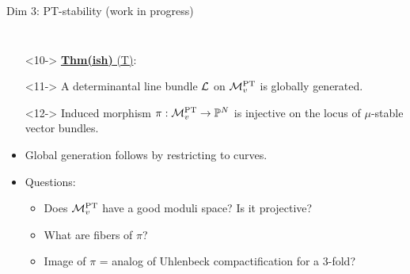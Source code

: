 \documentclass[8pt]{beamer} %
\begin{document}
\begin{frame}{Dim 3: PT-stability (work in progress)}
\begin{columns}[t]
        \begin{itemize}
            \item[]<10-> \underline{\textbf{Thm(ish)} (T)}: 
                \item[]<11-> A determinantal line bundle $\mathcal{L}$ on $\mathcal{M}^{\text{PT}}_v$ is globally generated.
                \item[]<12-> Induced morphism $\pi: \mathcal{M}^{\text{PT}}_v \to \mathbb{P}^N$ is injective on the locus of $\mu$-stable vector bundles.
            \item[]
            \item<13-> Global generation follows by restricting to curves.
            \item<14-> Questions:
            \begin{itemize}
                \item<15-> Does $\mathcal{M}^{\text{PT}}_v$ have a good moduli space? Is it projective?
                \item<16-> What are fibers of $\pi$?
                \item<17-> Image of $\pi$ = analog of Uhlenbeck compactification for a 3-fold?
            \end{itemize}
            
        \end{itemize}
    \end{columns}
\end{frame}
\end{document}
